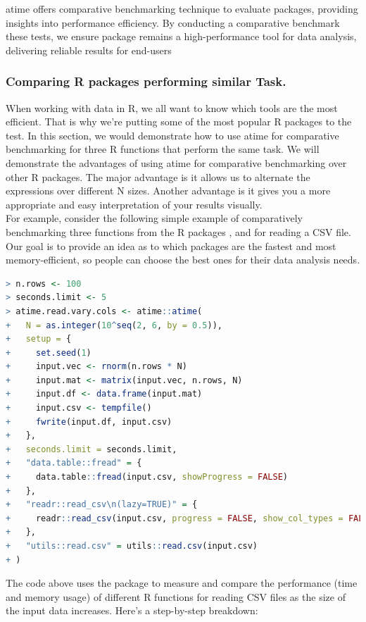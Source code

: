 \noindent atime offers comparative benchmarking technique to evaluate packages, providing insights into performance efficiency. By conducting a comparative benchmark these tests, we ensure package remains a high-performance tool for data analysis, delivering reliable results for end-users\\

\subsubsection{Comparing R packages performing similar Task.}
\noindent When working with data in R, we all want to know which tools are the most efficient. That is why we're putting some of the most popular R packages to the test. 
In this section, we would demonstrate how to use atime for comparative benchmarking for three R functions that perform the same task. We will demonstrate the advantages of using atime for comparative benchmarking over other R packages. The major advantage is it allows us to alternate the expressions over different N sizes. Another advantage is it gives you a more appropriate and easy interpretation of your results visually.\\

\noindent For example, consider the following simple example of comparatively benchmarking three functions from the R packages ,  and  for reading a CSV file. Our goal is to provide an idea as to which packages are the fastest and most memory-efficient, so people can choose the best ones for their data analysis needs.\\

\begin{lstlisting}[language=R]
> n.rows <- 100
> seconds.limit <- 5
> atime.read.vary.cols <- atime::atime(
+   N = as.integer(10^seq(2, 6, by = 0.5)),
+   setup = {
+     set.seed(1)
+     input.vec <- rnorm(n.rows * N)
+     input.mat <- matrix(input.vec, n.rows, N)
+     input.df <- data.frame(input.mat)
+     input.csv <- tempfile()
+     fwrite(input.df, input.csv)
+   },
+   seconds.limit = seconds.limit,
+   "data.table::fread" = {
+     data.table::fread(input.csv, showProgress = FALSE)
+   },
+   "readr::read_csv\n(lazy=TRUE)" = {
+     readr::read_csv(input.csv, progress = FALSE, show_col_types = FALSE, lazy = TRUE)
+   },
+   "utils::read.csv" = utils::read.csv(input.csv)
+ )
\end{lstlisting}

The code above uses the  package to measure and compare the performance (time and memory usage) of different R functions for reading CSV files as the size of the input data increases. Here's a step-by-step breakdown:

